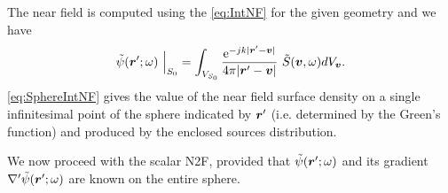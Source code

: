 \par The near field is computed using the \eqref{eq:IntNF} for the given geometry and we have
\begin{equation}
\label{eq:SphereIntNF}
\tilde{\psi}(\mbfit{r'}; \omega) \ \Big\vert_{S_0} = \int_{V_{S_0}} \frac{\mrm{e}^{-jk|\mbfit{r'}-\mbfit{v}|}}{4\pi|\mbfit{r'}-\mbfit{v}|} \ \tilde{S}(\mbfit{v}, \omega) d{V}_\mbfit{v}.
\end{equation} \eqref{eq:SphereIntNF} gives the value of the near field surface density on a single infinitesimal point of the sphere indicated by $\mbfit{r'}$ (i.e. determined by the Green's function) and produced by the enclosed sources distribution.

\par We now proceed with the scalar N2F, provided that $\tilde{\psi}(\mbfit{r'}; \omega)$ and its gradient ${\nabla}' \tilde{\psi}(\mbfit{r'}; \omega)$ are known on the entire sphere.

